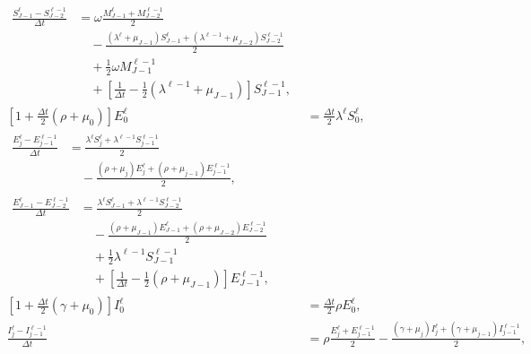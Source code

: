 \documentclass{jpmarticle}
\let\subequationsorig\subequations%
\let\endsubequationsorig\endsubequations%
\renewenvironment{subequations}{
  \subequationsorig
  \renewcommand{\theequation}{\theparentequation.\arabic{equation}}
}{
  \endsubequationsorig
}
\begin{document}
\begin{subequations}
\begin{align}
    \begin{split}
      \frac{S_{J - 1}^{\ell} - S_{J - 2}^{\ell - 1}}{\Delta t} &=
      \omega \frac{M_{J - 1}^{\ell} + M_{J - 2}^{\ell - 1}}{2}
      \\ & \quad {}
      - \frac{(\lambda^{\ell} + \mu_{J - 1}) S_{J - 1}^{\ell}
        + (\lambda^{\ell - 1} + \mu_{J - 2}) S_{J - 2}^{\ell - 1}}
      {2}
      \\ & \quad {}
      + \frac{1}{2} \omega M_{J - 1}^{\ell - 1}
      \\ & \quad {}
      + \left[
        \frac{1}{\Delta t} - \frac{1}{2} (\lambda^{\ell - 1} + \mu_{J - 1})
      \right] S_{J - 1}^{\ell - 1},
    \end{split}
    \\
    \left[1 + \frac{\Delta t}{2} (\rho + \mu_0)\right] E_0^{\ell}
    &= \frac{\Delta t}{2} \lambda^{\ell} S_0^{\ell},
    \\
    \begin{split}
      \frac{E_j^{\ell} - E_{j - 1}^{\ell - 1}}{\Delta t} &=
      \frac{\lambda^{\ell} S_j^{\ell} + \lambda^{\ell - 1} S_{j - 1}^{\ell - 1}}{2}
      \\ & \quad {}
      - \frac{(\rho + \mu_j) E_j^{\ell}
        + (\rho + \mu_{j - 1}) E_{j - 1}^{\ell - 1}}{2},
    \end{split}
    \\
    \begin{split}
      \frac{E_{J - 1}^{\ell} - E_{J - 2}^{\ell - 1}}{\Delta t} &=
      \frac{\lambda^{\ell} S_{J - 1}^{\ell}
        + \lambda^{\ell - 1} S_{J - 2}^{\ell - 1}}{2}
      \\ & \quad {}
      - \frac{(\rho + \mu_{J - 1}) E_{J - 1}^{\ell}
        + (\rho + \mu_{J - 2}) E_{J - 2}^{\ell - 1}}{2}
      \\ & \quad {}
      + \frac{1}{2} \lambda^{\ell - 1} S_{J - 1}^{\ell - 1}
      \\ & \quad {}
      + \left[
        \frac{1}{\Delta t} - \frac{1}{2} (\rho + \mu_{J - 1})
      \right] E_{J - 1}^{\ell - 1},
    \end{split}
    \\
    \left[1 + \frac{\Delta t}{2} (\gamma + \mu_0)\right] I_0^{\ell}
    &= \frac{\Delta t}{2} \rho E_0^{\ell},
    \\
    \frac{I_j^{\ell} - I_{j - 1}^{\ell - 1}}{\Delta t} &=
    \rho \frac{E_j^{\ell} + E_{j - 1}^{\ell - 1}}{2}
    - \frac{(\gamma + \mu_j) I_j^{\ell}
      + (\gamma + \mu_{j - 1}) I_{j - 1}^{\ell - 1}}{2},
    \\

\end{align}
\end{subequations}
\end{document}
